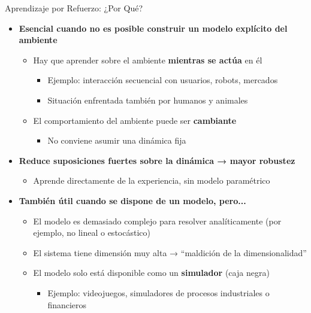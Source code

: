 \documentclass[handout]{beamer}
\begin{document}
\begin{frame}{Aprendizaje por Refuerzo: ¿Por Qué?}
\begin{itemize}
\item<1-> \textbf{Esencial cuando no es posible construir un modelo explícito del ambiente}
\begin{itemize}
    \item<2-> Hay que aprender sobre el ambiente \textbf{mientras se actúa} en él
    \begin{itemize}
        \item<3-> Ejemplo: interacción secuencial con usuarios, robots, mercados
        \item<4-> Situación enfrentada también por humanos y animales
    \end{itemize}
    \item<5-> El comportamiento del ambiente puede ser \textbf{cambiante}
    \begin{itemize}
        \item<6-> No conviene asumir una dinámica fija
    \end{itemize}
\end{itemize}

\item<7-> \textbf{Reduce suposiciones fuertes sobre la dinámica → mayor robustez}
\begin{itemize}
    \item<8-> Aprende directamente de la experiencia, sin modelo paramétrico
\end{itemize}

\item<9-> \textbf{También útil cuando se dispone de un modelo, pero...}
\begin{itemize}
    \item<10-> El modelo es demasiado complejo para resolver analíticamente (por ejemplo, no lineal o estocástico)
    \item<11-> El sistema tiene dimensión muy alta → “maldición de la dimensionalidad”
    \item<12-> El modelo solo está disponible como un \textbf{simulador} (caja negra)
    \begin{itemize}
        \item<13-> Ejemplo: videojuegos, simuladores de procesos industriales o financieros
    \end{itemize}
\end{itemize}
\end{itemize}
\end{frame}
\end{document}
